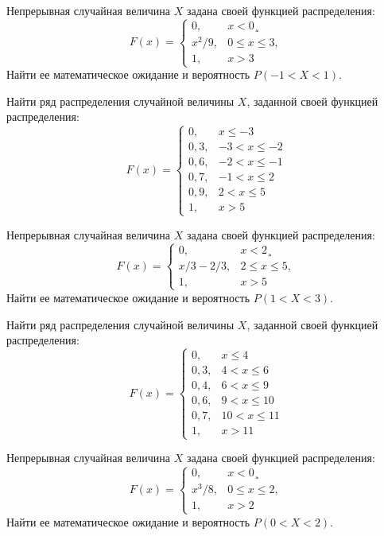\vfill

\z Непрерывная случайная величина $X$ задана своей функцией распределения: $$ F(x) = \begin{cases}0, & x < 0¸\\ x^2/9, & 0 \leqslant x \leqslant 3, \\ 1, & x > 3 \end{cases} $$ Найти ее математическое ожидание и вероятность $P(-1 < X < 1)$.
 

\vfill

\newpage\setcounter{zad}{0}

\z Найти ряд распределения случайной величины $X$, заданной своей функцией распределения: $$ F(x) = \begin{cases}0, & x \leqslant -3 \\ 0{,}3, & -3 < x \leqslant -2 \\ 0{,}6, & -2 < x \leqslant -1 \\ 0{,}7, & -1 < x \leqslant 2 \\ 0{,}9, & 2 < x \leqslant 5 \\ 1, & x > 5 \end{cases} $$


\vfill

\z Непрерывная случайная величина $X$ задана своей функцией распределения: $$ F(x) = \begin{cases}0, & x < 2¸\\ x/3-2/3, & 2 \leqslant x \leqslant 5, \\ 1, & x > 5 \end{cases} $$ Найти ее математическое ожидание и вероятность $P(1 < X < 3)$.
 

\vfill

\newpage\setcounter{zad}{0}

\z Найти ряд распределения случайной величины $X$, заданной своей функцией распределения: $$ F(x) = \begin{cases}0, & x \leqslant 4 \\ 0{,}3, & 4 < x \leqslant 6 \\ 0{,}4, & 6 < x \leqslant 9 \\ 0{,}6, & 9 < x \leqslant 10 \\ 0{,}7, & 10 < x \leqslant 11 \\ 1, & x > 11 \end{cases} $$


\vfill

\z Непрерывная случайная величина $X$ задана своей функцией распределения: $$ F(x) = \begin{cases}0, & x < 0¸\\ x^3/8, & 0 \leqslant x \leqslant 2, \\ 1, & x > 2 \end{cases} $$ Найти ее математическое ожидание и вероятность $P(0 < X < 2)$.
 

